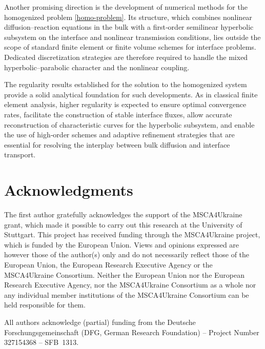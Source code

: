 \documentclass[reqno]{amsart}            %
\numberwithin{equation}{section}
\begin{document}
Another promising direction is the development of numerical methods for the homogenized problem \eqref{homo-problem}. Its structure, which combines nonlinear diffusion–reaction equations in the bulk with a first‑order semilinear hyperbolic subsystem on the interface and nonlinear transmission conditions, lies outside the scope of standard finite element or finite volume schemes for interface problems. Dedicated discretization strategies are therefore required to handle the mixed hyperbolic–parabolic character and the nonlinear coupling.

The regularity results established for the solution to the homogenized system provide a solid analytical foundation for such developments. As in classical finite element analysis, higher regularity is expected to ensure optimal convergence rates, facilitate the construction of stable interface fluxes, allow accurate reconstruction of characteristic curves for the hyperbolic subsystem, and enable the use of high‑order schemes and adaptive refinement strategies that are essential for resolving the interplay between bulk diffusion and interface transport.

	
	\section*{Acknowledgments}
	The first author gratefully acknowledges the support of  the MSCA4Ukraine grant, which made it possible to carry out this research at the University of Stuttgart. This project has received funding through the MSCA4Ukraine project, which is funded by the 
	European Union. Views and opinions expressed are however those of the author(s) only and do not 
	necessarily reflect those of the European Union, the European Research Executive Agency or the 
	MSCA4Ukraine Consortium. Neither the European Union nor the European Research Executive 
	Agency, nor the MSCA4Ukraine Consortium as a whole nor any individual member institutions of 
	the MSCA4Ukraine Consortium can be held responsible for them.
	
	All authors acknowledge  (partial) funding from the Deutsche Forschungsgemeinschaft (DFG, German Research Foundation) – Project Number 327154368 – SFB 1313.
	
\end{document}
